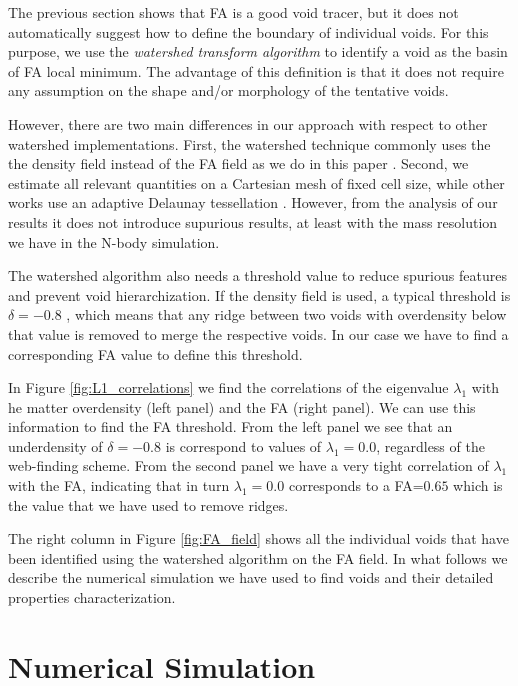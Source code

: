 \documentclass[a4,useAMS,usenatbib,usegraphicx]{mn2e}
\begin{document}
The previous section shows that FA is a good void tracer, but it does
not automatically suggest how to define the boundary of individual
voids.
For this purpose, we use the \textit{watershed transform algorithm}
\citep{Beucher79,Beucher93} to identify a void as the basin of FA
local minimum. 
The advantage of this definition is that it does not require any
assumption on the shape and/or morphology of the tentative voids. 

However, there are two main differences in our approach with respect to other
watershed implementations.
First, the watershed technique commonly uses the the density field
instead of the FA field as we do in this paper
\citep{Platen07,Neyrinck08}.   
Second, we estimate all relevant quantities on a Cartesian mesh of
fixed cell size, while other works use an adaptive Delaunay tessellation
\citep{Schaap00}.
However, from the analysis of our results it does not 
introduce supurious results, at least with the mass resolution we have
in the N-body simulation. 

The watershed algorithm also needs a threshold value to reduce
spurious features and prevent void hierarchization.  
If the density field is used, a typical threshold is
$\delta = -0.8$ \citep{Platen07},  which means that any ridge between
two voids with overdensity below that value is removed to merge the
respective voids. 
In our case we have to find a corresponding FA value
to define this threshold. 

In Figure \ref{fig:L1_correlations} we find the correlations of
the eigenvalue $\lambda_1$ with he matter overdensity (left panel) and
the FA (right panel).
We can use this information to find the FA threshold. 
From the left panel we see that an underdensity of $\delta=-0.8$ is
correspond to values of $\lambda_1=0.0$, regardless of the web-finding
scheme.
From the second panel we have a very tight correlation of $\lambda_1$
with the FA, indicating that in turn $\lambda_1=0.0$ corresponds to a
FA=$0.65$ which is the value that we have used to remove ridges. 

The right column in Figure \ref{fig:FA_field} shows all the individual
voids that have been identified using the watershed algorithm on the
FA field. 
In what follows we describe the numerical simulation we have used to
find voids and their detailed properties characterization.


\section{Numerical Simulation}
\label{sec:simulations}
\end{document}
